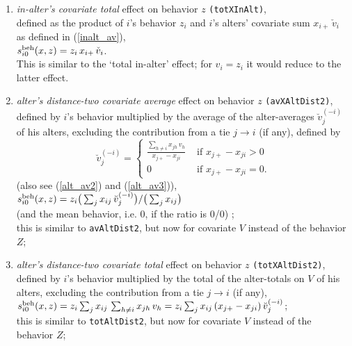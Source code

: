 \documentclass[a4paper,fleqn,11pt]{article}
\newcommand{\+}{\, + \,}
\newcommand{\vit}{\theenumi}
\begin{document}
\begin{enumerate}
\item \emph{in-alter's covariate total } effect on behavior $z$
 \texttt{(totXInAlt)},\\
      defined as the product of $i$'s behavior $z_i$ and
      $i$'s alters' covariate sum $x_{i+}\,\check v_i$ as defined
      in (\ref{inalt_av}),\\
       $s^{\rm beh}_{i\vit}(x, z) = z_i \, x_{i+}\, \check v_i $.\\
      This is similar to the `total in-alter' effect; for
      $v_i = z_i$ it would reduce to the latter effect.

 \item {\em alter's distance-two covariate average} effect on behavior $z$ \texttt{(avXAltDist2)},
 defined by  $i$'s
 behavior multiplied by the average of the alter-averages $\breve v_j^{(-i)}$ of his alters,
 excluding the contribution from a tie $j \rightarrow i$ (if any),
 defined by
\begin{equation}
  \breve v_j^{(-i)} = \left\{\begin{array}{ll} \displaystyle
         \frac{\sum_{h \neq i} x_{jh}\,v_h}{x_{j+} - x_{ji}}  &
                                       \text{ if } x_{j+} - x_{ji} > 0     \\
         0                                &  \text{ if } x_{j+}- x_{ji} = 0  .
  \end{array}   \right.            \label{alt_av4}
\end{equation}
(also see (\ref{alt_av2}) and (\ref{alt_av3})), \\
 $s^{\rm beh}_{i\vit}(x, z) =  z_i \big( \sum_j x_{ij}\, \breve v_j^{(-i)} \big)
                                / \big (\sum_j x_{ij}\big)  $\\[0.5ex]
 (and the mean behavior, i.e. $0$, if the ratio is 0/0) ;\\
 this is similar to \texttt{avAltDist2}, but now for covariate $V$
 instead of the behavior $Z$;

 \item {\em alter's distance-two covariate total} effect on behavior $z$ \texttt{(totXAltDist2)},
 defined by  $i$'s
 behavior multiplied by the total of the alter-totals on $V$ of his alters,
 excluding the contribution from a tie $j \rightarrow i$ (if any),\\
 $s^{\rm beh}_{i\vit}(x, z) = z_i \sum_j x_{ij}\, \sum_{h \neq i} x_{jh}\,v_h =
         z_i \sum_j x_{ij}\, (x_{j+}- x_{ji}) \, \breve v_j^{(-i)}  $;\\[0.5ex]
 this is similar to \texttt{totAltDist2}, but now for covariate $V$
 instead of the behavior $Z$;


\end{enumerate}
\end{document}
